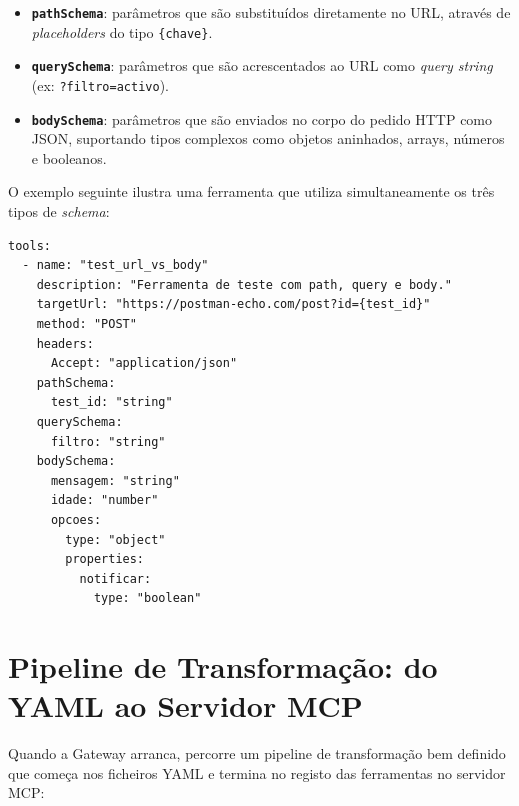 \begin{itemize}
    \item \textbf{\texttt{pathSchema}}: parâmetros que são substituídos diretamente no URL, através de \textit{placeholders} do tipo \texttt{\{chave\}}.
    \item \textbf{\texttt{querySchema}}: parâmetros que são acrescentados ao URL como \textit{query string} (ex: \texttt{?filtro=activo}).
    \item \textbf{\texttt{bodySchema}}: parâmetros que são enviados no corpo do pedido HTTP como JSON, suportando tipos complexos como objetos aninhados, arrays, números e booleanos.
\end{itemize}

O exemplo seguinte ilustra uma ferramenta que utiliza simultaneamente os três tipos de \textit{schema}:

\begin{lstlisting}[caption={Exemplo de ferramenta com os três tipos de schema.}]
tools:
  - name: "test_url_vs_body"
    description: "Ferramenta de teste com path, query e body."
    targetUrl: "https://postman-echo.com/post?id={test_id}"
    method: "POST"
    headers:
      Accept: "application/json"
    pathSchema:
      test_id: "string"
    querySchema:
      filtro: "string"
    bodySchema:
      mensagem: "string"
      idade: "number"
      opcoes:
        type: "object"
        properties:
          notificar:
            type: "boolean"
\end{lstlisting}

\section{Pipeline de Transformação: do YAML ao Servidor MCP}

Quando a Gateway arranca, percorre um pipeline de transformação bem definido que começa nos ficheiros YAML e termina no registo das ferramentas no servidor MCP:

